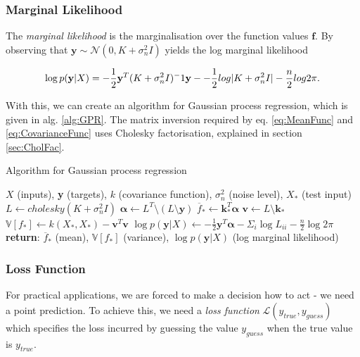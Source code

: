 \documentclass[12pt,a4paper]{report}
\theoremstyle{definition}
\begin{document}
\subsubsection{Marginal Likelihood}

The \emph{marginal likelihood} is the marginalisation over the function values $\textbf{f}$. 
By observing that $\textbf{y} \sim \mathcal{N} (0, K + \sigma_{n}^2I)$ yields the log marginal likelihood

\begin{equation}
	\label{eq:LogMargLik}
	\centering
	\log p(\textbf{y} | X) = -\frac{1}{2}\textbf{y}^T(K +  \sigma_{n}^2I)^-1\textbf{y} - -\frac{1}{2}log|K +  \sigma_{n}^2I| - \frac{n}{2}log2\pi.
\end{equation}

With this, we can create an algorithm for Gaussian process regression, which is given in alg. \ref{alg:GPR}. The matrix inversion required by eq. \ref{eq:MeanFunc} and \ref{eq:CovarianceFunc} uses Cholesky factorisation, explained in section \ref{sec:CholFac}. 

\begin{algorithm}
	\caption{Algorithm for Gaussian process regression}
	\label{alg:GPR}
	\begin{algorithmic}[1]
		\Require $X$ (inputs), \textbf{y} (targets), $k$ (covariance function), $\sigma_{n}^2$ (noise level), $X_{*}$ (test input)	
		\State $L \gets cholesky(K +\sigma_{n}^2I)$
		\State $\boldsymbol{\alpha} \gets L^T \setminus (L \setminus \textbf{y})$ 
		\State $\overline{f}_{*} \gets \textbf{k}_{*}^T \boldsymbol{\alpha}$ 
		\State $\textbf{v} \gets L \setminus \textbf{k}_{*}$ 
		\State $\mathbb{V}[f_{*}] \gets k(X_{*}, X_{*}) - \textbf{v}^T\textbf{v}$ 
		\State $\log p(\textbf{y} | X) \gets -\frac{1}{2} \textbf{y}^T \boldsymbol{\alpha} - \Sigma_{i} \log L_{ii} - \frac{n}{2} \log2\pi$ 
		\State \textbf{return}: $\overline{f}_{*}$ (mean), $\mathbb{V}[f_{*}]$ (variance), $\log p(\textbf{y} | X)$ (log marginal likelihood)
	\end{algorithmic}
\end{algorithm}

\subsubsection{Loss Function}

For practical applications, we are forced to make a decision how to act - we need a point prediction. 
To achieve this, we need a \emph{loss function} $\mathcal{L}(y_{true}, y_{guess})$ which specifies the loss incurred by guessing the value $y_{guess}$ when the true value is $y_{true}$. 
\end{document}
